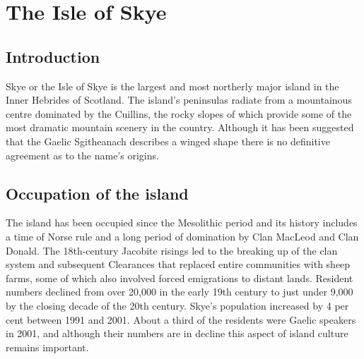 \documentclass{book}
\begin{document}
\chapter{The Isle of Skye}

\section{Introduction}
Skye or the Isle of Skye is the largest and most northerly major island
in the Inner Hebrides of Scotland. The island's peninsulas radiate from
a mountainous centre dominated by the Cuillins, the rocky slopes of
which provide some of the most dramatic mountain scenery in the country.
Although it has been suggested that the Gaelic Sgitheanach describes a
winged shape there is no definitive agreement as to the name's origins.

\section{Occupation of the island}
The island has been occupied since the Mesolithic period and its history
includes a time of Norse rule and a long period of domination by Clan
MacLeod and Clan Donald. The 18th-century Jacobite risings led to the
breaking up of the clan system and subsequent Clearances that replaced
entire communities with sheep farms, some of which also involved forced
emigrations to distant lands. Resident numbers declined from over 20,000
in the early 19th century to just under 9,000 by the closing decade of
the 20th century. Skye's population increased by 4 per cent between 1991
and 2001. About a third of the residents were Gaelic speakers in 2001,
and although their numbers are in decline this aspect of island culture
remains important.

\end{document}
